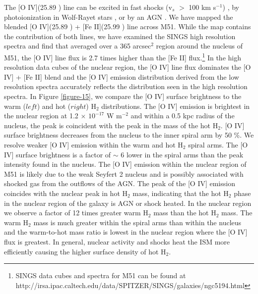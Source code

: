 \documentclass[12pt,preprint]{aastex}
\begin{document}
The [O IV](25.89 \micron) line can be excited in fast shocks 
(v$_s$ $>$ 100 km s$^{-1}$) \citep{lutz98},
by photoionization in Wolf-Rayet stars \citep{ss99}, or by an
AGN \citep{smi04}.  We have mapped the blended 
[O IV](25.89 \micron) + [Fe II](25.99 \micron) line across M51.  
While the map contains the contribution of both lines, we have examined the SINGS 
high resolution spectra and find that averaged over a 
365 arcsec$^2$ region around the nucleus of M51, the [O IV] line flux is 2.7 times 
higher than the [Fe II] flux.\footnote{SINGS data cubes and spectra for M51 can be found at 
http://irsa.ipac.caltech.edu/data/SPITZER/SINGS/galaxies/ngc5194.html} 
In the high resolution data cubes of the nuclear region, 
the [O IV] line flux dominates the [O IV] + [Fe II] blend and the [O IV] 
emission distribution derived from the low resolution spectra accurately reflects 
the distribution seen in the high resolution spectra.
In Figure \ref{figure-15}, we compare 
the [O IV] surface brightness to the warm ($left$) and hot ($right$) H$_2$ distributions.  
The [O IV] emission is brightest in the nuclear region at 1.2 $\times$
$\mathrm{10^{-17}}$ W $\mathrm{m^{-2}}$ and within a 0.5 kpc radius of the nucleus, the peak is coincident with the peak in the mass of the hot H$_2$.  [O IV]
surface brightness decreases from the nucleus to the inner spiral arm by 50 \%.
We resolve weaker [O IV] emission within the warm and hot
H$_2$ spiral arms.  The [O IV] surface brightness
is a factor of $\sim$ 6 lower in the spiral arms than the peak
intensity found in the nucleus.  The [O IV] emission within the nuclear 
region of M51 is likely due to the weak Seyfert 2 nucleus \citep{ford85} 
and is possibly associated with shocked gas from the outflows of the AGN.  
The peak of the [O IV] emission coincides with the nuclear peak in hot 
H$_2$ mass, indicating that the hot H$_2$ phase in the 
nuclear region of the galaxy is AGN or shock heated. 
In the nuclear region we observe a factor of 12 times greater
warm H$_2$ mass than the hot H$_2$ mass.  
The warm H$_2$ mass is much
greater within the spiral arms than within the nucleus and the
warm-to-hot mass ratio is lowest in the nuclear region where 
the [O IV] flux is greatest.  In general, nuclear activity and shocks 
heat the ISM more efficiently causing the higher surface 
density of hot H$_2$.
\end{document}
